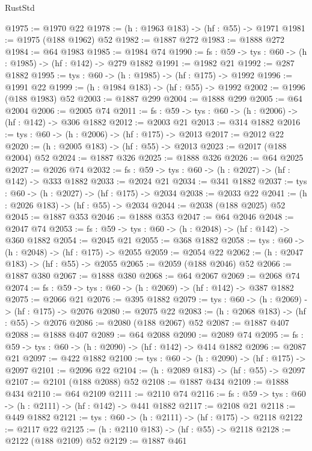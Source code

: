 \begin{lexlean}{RustStd}
\begin{coremodule}
@1975 := @1970 @22
@1978 := (h : @1963 @183) -> (hf : @55) -> @1971
@1981 := @1975 (@188 @1962) @52
@1982 := @1887 @272
@1983 := @1888 @272
@1984 := @64 @1983
@1985 := @1984 @74
@1990 := {fs : @59} -> {tys : @60} -> (h : @1985) -> (hf : @142) -> @279 @1882
@1991 := @1982 @21
@1992 := @287 @1882
@1995 := {tys : @60} -> (h : @1985) -> (hf : @175) -> @1992
@1996 := @1991 @22
@1999 := (h : @1984 @183) -> (hf : @55) -> @1992
@2002 := @1996 (@188 @1983) @52
@2003 := @1887 @299
@2004 := @1888 @299
@2005 := @64 @2004
@2006 := @2005 @74
@2011 := {fs : @59} -> {tys : @60} -> (h : @2006) -> (hf : @142) -> @306 @1882
@2012 := @2003 @21
@2013 := @314 @1882
@2016 := {tys : @60} -> (h : @2006) -> (hf : @175) -> @2013
@2017 := @2012 @22
@2020 := (h : @2005 @183) -> (hf : @55) -> @2013
@2023 := @2017 (@188 @2004) @52
@2024 := @1887 @326
@2025 := @1888 @326
@2026 := @64 @2025
@2027 := @2026 @74
@2032 := {fs : @59} -> {tys : @60} -> (h : @2027) -> (hf : @142) -> @333 @1882
@2033 := @2024 @21
@2034 := @341 @1882
@2037 := {tys : @60} -> (h : @2027) -> (hf : @175) -> @2034
@2038 := @2033 @22
@2041 := (h : @2026 @183) -> (hf : @55) -> @2034
@2044 := @2038 (@188 @2025) @52
@2045 := @1887 @353
@2046 := @1888 @353
@2047 := @64 @2046
@2048 := @2047 @74
@2053 := {fs : @59} -> {tys : @60} -> (h : @2048) -> (hf : @142) -> @360 @1882
@2054 := @2045 @21
@2055 := @368 @1882
@2058 := {tys : @60} -> (h : @2048) -> (hf : @175) -> @2055
@2059 := @2054 @22
@2062 := (h : @2047 @183) -> (hf : @55) -> @2055
@2065 := @2059 (@188 @2046) @52
@2066 := @1887 @380
@2067 := @1888 @380
@2068 := @64 @2067
@2069 := @2068 @74
@2074 := {fs : @59} -> {tys : @60} -> (h : @2069) -> (hf : @142) -> @387 @1882
@2075 := @2066 @21
@2076 := @395 @1882
@2079 := {tys : @60} -> (h : @2069) -> (hf : @175) -> @2076
@2080 := @2075 @22
@2083 := (h : @2068 @183) -> (hf : @55) -> @2076
@2086 := @2080 (@188 @2067) @52
@2087 := @1887 @407
@2088 := @1888 @407
@2089 := @64 @2088
@2090 := @2089 @74
@2095 := {fs : @59} -> {tys : @60} -> (h : @2090) -> (hf : @142) -> @414 @1882
@2096 := @2087 @21
@2097 := @422 @1882
@2100 := {tys : @60} -> (h : @2090) -> (hf : @175) -> @2097
@2101 := @2096 @22
@2104 := (h : @2089 @183) -> (hf : @55) -> @2097
@2107 := @2101 (@188 @2088) @52
@2108 := @1887 @434
@2109 := @1888 @434
@2110 := @64 @2109
@2111 := @2110 @74
@2116 := {fs : @59} -> {tys : @60} -> (h : @2111) -> (hf : @142) -> @441 @1882
@2117 := @2108 @21
@2118 := @449 @1882
@2121 := {tys : @60} -> (h : @2111) -> (hf : @175) -> @2118
@2122 := @2117 @22
@2125 := (h : @2110 @183) -> (hf : @55) -> @2118
@2128 := @2122 (@188 @2109) @52
@2129 := @1887 @461

\end{coremodule}
\end{lexlean}
